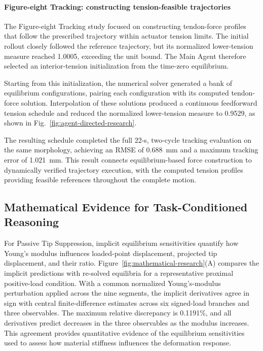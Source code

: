 \paragraph{Figure-eight Tracking: constructing tension-feasible trajectories}

The Figure-eight Tracking study focused on constructing tendon-force profiles that follow the prescribed trajectory within actuator tension limits. The initial rollout closely followed the reference trajectory, but its normalized lower-tension measure reached 1.0005, exceeding the unit bound. The Main Agent therefore selected an interior-tension initialization from the time-zero equilibrium.

Starting from this initialization, the numerical solver generated a bank of equilibrium configurations, pairing each configuration with its computed tendon-force solution. Interpolation of these solutions produced a continuous feedforward tension schedule and reduced the normalized lower-tension measure to 0.9529, as shown in Fig.~\ref{fig:agent-directed-research}.

The resulting schedule completed the full 22-s, two-cycle tracking evaluation on the same morphology, achieving an RMSE of 0.688~mm and a maximum tracking error of 1.021~mm. This result connects equilibrium-based force construction to dynamically verified trajectory execution, with the computed tension profiles providing feasible references throughout the complete motion.

\subsection{Mathematical Evidence for Task-Conditioned Reasoning}
\label{subsec:evidence-validation}

For Passive Tip Suppression, implicit equilibrium sensitivities quantify how Young's modulus influences loaded-point displacement, projected tip displacement, and their ratio. Figure~\ref{fig:mathematical-research}(A) compares the implicit predictions with re-solved equilibria for a representative proximal positive-load condition. With a common normalized Young's-modulus perturbation applied across the nine segments, the implicit derivatives agree in sign with central finite-difference estimates across six signed-load branches and three observables. The maximum relative discrepancy is 0.1191\%, and all derivatives predict decreases in the three observables as the modulus increases. This agreement provides quantitative evidence of the equilibrium sensitivities used to assess how material stiffness influences the deformation response.

